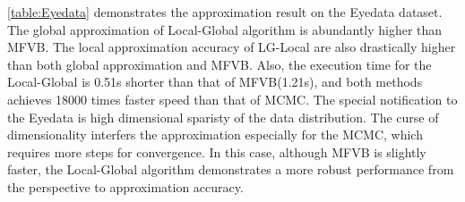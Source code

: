 \autoref{table:Eyedata} demonstrates the approximation result on the Eyedata dataset.  The global approximation of Local-Global algorithm is abundantly higher than MFVB.  The local approximation accuracy of LG-Local are also drastically higher than both global approximation and MFVB. Also, the execution time for the Local-Global is 0.51s shorter than that of MFVB(1.21s), and both methods achieves 18000 times faster speed than that of MCMC.
The special notification to the Eyedata is high dimensional sparisty of the data distribution. The curse of dimensionality interfers the approximation especially for the MCMC, which requires more steps for convergence. In this case, although MFVB is slightly faster, the Local-Global algorithm demonstrates a more robust performance from the perspective to approximation accuracy.






